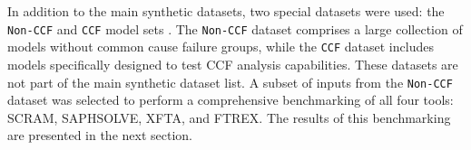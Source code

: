 In addition to the main synthetic datasets, two special datasets were used: the \texttt{Non-CCF} and \texttt{CCF} model sets \cite{earthperson_dataset_2023}. The \texttt{Non-CCF} dataset comprises a large collection of models without common cause failure groups, while the \texttt{CCF} dataset includes models specifically designed to test CCF analysis capabilities. These datasets are not part of the main synthetic dataset list. A subset of inputs from the \texttt{Non-CCF} dataset was selected to perform a comprehensive benchmarking of all four tools: SCRAM, SAPHSOLVE, XFTA, and FTREX. The results of this benchmarking are presented in the next section.



\begin{comment}
# Benchmark environment for profiling:
Hardware Model -- Dell Inc. Latitude E7470
Memory -- 8.0GiB
Processor -- Intel® Core™ i7-6600U CPU @ 2.60GHz × 4
Graphics -- Mesa Intel® HD Graphics 520 (SKL GT2)
Disk Capacity -- 256.1GB
OS Name -- Ubuntu 22.04.1 LTS
OS Type -- 64-bit

# Benchmark environment for all benchmarking other than profiling:
options:
resource limits:
- memory:                63000.0 MB
- time:                  900 s
- cpu cores:             1

# 100_to_100k_voter
RUN 1:
- Only SCRAM has been tested against this dataset. Only wall clock time has been recorded.

# 1_to_4k/saphsolve-jsinp
- SCRAM (MOCUS REA, MOCUS MCUB, BDD), XFTA, SAPHSOLVE have been benchmarked.
- Wall time, CPU time, and memory usage have been calculated.

# 1_to_50k

RUN 3:
- SAPHSOLVE and XFTA
- SAPHSOLVE (MOCUS MCUB) has been benchmarked for 2 truncation limits: 1E-14 and 1E-20.

# 1_to_5k

RUN 1:
- SAPHSOLVE and XFTA
- SCRAM (MOCUS REA, MOCUS MCUB, BDD), XFTA, SAPHSOLVE have been benchmarked.
- Wall time, CPU time, and memory usage have been calculated.

RUN 2:
- Only SAPHSOLVE
- Only CPU time and clock time

# 2_to_100k

RUN 2:
- SCRAM and XFTA have been tested against this dataset. For SCRAM - MOCUS, BDD, ZBDD have been utilized but in case of XFTA it is unknown which algorithm it used (MOCUS or BDD?).
-Only the wall clock time and CPU time have been calculated.


\end{comment}
